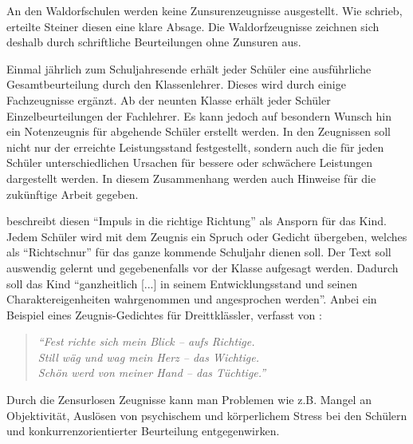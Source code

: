 An den Waldorfschulen werden keine Zunsurenzeugnisse ausgestellt. Wie \cite{geuenich09} schrieb, erteilte Steiner diesen eine klare Absage. Die Waldorfzeugnisse zeichnen sich deshalb durch schriftliche Beurteilungen ohne Zunsuren aus. 

Einmal jährlich zum Schuljahresende erhält jeder Schüler eine ausführliche Gesamtbeurteilung durch den Klassenlehrer. Dieses wird durch einige Fachzeugnisse ergänzt. Ab der neunten Klasse erhält jeder Schüler Einzelbeurteilungen der Fachlehrer. Es kann jedoch auf besondern Wunsch hin ein Notenzeugnis für abgehende Schüler erstellt werden. In den Zeugnissen soll nicht nur der erreichte Leistungsstand festgestellt, sondern auch die für jeden Schüler unterschiedlichen Ursachen für bessere oder schwächere Leistungen dargestellt werden. In diesem Zusammenhang werden auch Hinweise für die zukünftige Arbeit gegeben. \citep[Vgl.][S. 51]{kiersch07} 

 \citet[S. 102]{geuenich09} beschreibt diesen \enquote{Impuls in die richtige Richtung} als Ansporn für das Kind. Jedem Schüler wird mit dem Zeugnis ein Spruch oder Gedicht übergeben, welches als \enquote{Richtschnur} für das ganze kommende Schuljahr dienen soll. Der Text soll auswendig gelernt und gegebenenfalls vor der Klasse aufgesagt werden. Dadurch soll das Kind \enquote{ganzheitlich [...] in seinem Entwicklungsstand und seinen Charaktereigenheiten wahrgenommen und angesprochen werden}. Anbei ein Beispiel eines Zeugnis-Gedichtes für Dreittklässler, verfasst von \cite{kullak13}:

 \begin{quotation}
			\emph{\enquote{Fest richte sich mein Blick – aufs Richtige.\\
							Still wäg und wag mein Herz – das Wichtige.\\
							Schön werd von meiner Hand – das Tüchtige.}}
\end{quotation}

Durch die Zensurlosen Zeugnisse kann man Problemen wie z.B. Mangel an Objektivität, Auslösen von psychischem und körperlichem Stress bei den Schülern und konkurrenzorientierter Beurteilung entgegenwirken. 



 








